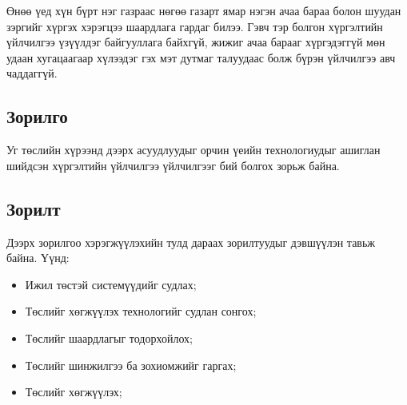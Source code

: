 
\begin{intro}
\addchaptertocentry{\introname}
\bigskip

Өнөө үед хүн бүрт нэг газраас нөгөө газарт ямар нэгэн ачаа бараа болон шуудан зэргийг хүргэх хэрэгцээ шаардлага гардаг билээ. Гэвч тэр болгон хүргэлтийн үйлчилгээ үзүүлдэг байгууллага байхгүй, жижиг ачаа барааг хүргэдэггүй мөн удаан хугацаагаар хүлээдэг гэх мэт дутмаг талуудаас болж бүрэн үйлчилгээ авч чаддаггүй.

\subsection*{Зорилго}
Уг төслийн хүрээнд дээрх асуудлуудыг орчин үеийн технологиудыг ашиглан шийдсэн хүргэлтийн үйлчилгээ үйлчилгээг бий болгох зорьж байна.

\subsection*{Зорилт}
Дээрх зорилгоо хэрэгжүүлэхийн тулд дараах зорилтуудыг дэвшүүлэн тавьж байна.
Үүнд:
\begin{itemize}[label={--}]
    \item Ижил төстэй системүүдийг судлах;
	\item Төслийг хөгжүүлэх технологийг судлан сонгох;
	\item Төслийг шаардлагыг тодорхойлох;
	\item Төслийг шинжилгээ ба зохиомжийг гаргах;
	\item Төслийг хөгжүүлэх;
\end{itemize}


\end{intro}
